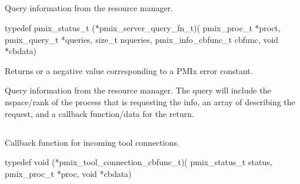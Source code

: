 \subsection{}

\summary

Query information from the resource manager.

\format

\cspecificstart
\begin{codepar}
typedef pmix_status_t (*pmix_server_query_fn_t)(
                             pmix_proc_t *proct,
                             pmix_query_t *queries, size_t nqueries,
                             pmix_info_cbfunc_t cbfunc,
                             void *cbdata)
\end{codepar}
\cspecificend

\begin{arglist}
\end{arglist}

Returns  or a negative value corresponding to a PMIx error constant.

\descr

Query information from the resource manager.
The query will include the nspace/rank of the process that is requesting the info, an array of  describing the request, and a callback function/data for the return.


\subsection{}

\summary

Callback function for incoming tool connections.

\format

\cspecificstart
\begin{codepar}
typedef void (*pmix_tool_connection_cbfunc_t)(
                    pmix_status_t status,
                    pmix_proc_t *proc, void *cbdata)
\end{codepar}
\cspecificend

